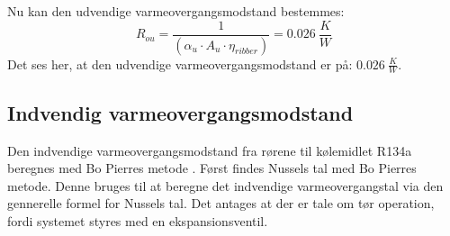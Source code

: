 \documentclass[../Hovedrapport.tex]{subfiles}
\begin{document}

Nu kan den udvendige varmeovergangsmodstand bestemmes:
\begin{equation}
R_{ou} = \frac {1}{  \left( \alpha_{u} \cdot  A_{u} \cdot  \eta_{ribber} \right)  } = \SI{0,026}{\frac{K}{W}}
\end{equation}
Det ses her, at den udvendige varmeovergangsmodstand er på: $\SI{0,026}{\frac{K}{W}}$.

\subsection{Indvendig varmeovergangsmodstand}
    \label{sec:Indvendig varmeovergangsmodstand}

Den indvendige varmeovergangsmodstand fra rørene til kølemidlet R134a beregnes med Bo Pierres metode \citep{koleteknik}. Først findes Nussels tal med Bo Pierres metode. Denne bruges til at beregne det indvendige varmeovergangstal via den gennerelle formel for Nussels tal. Det antages at der er tale om tør operation, fordi systemet styres med en ekspansionsventil. 
\end{document}
